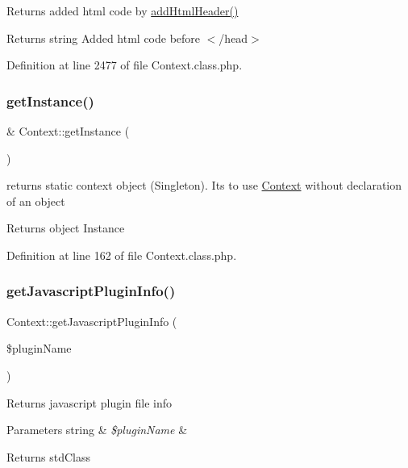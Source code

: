 Returns added html code by \hyperlink{classContext_a26a1aea944ae54bb826500f544a67950}{add\+Html\+Header()}

\begin{DoxyReturn}{Returns}
string Added html code before $<$/head$>$ 
\end{DoxyReturn}


Definition at line 2477 of file Context.\+class.\+php.

\hypertarget{classContext_a399e419617c7fe9b0c9eaf22c431df69}{}\label{classContext_a399e419617c7fe9b0c9eaf22c431df69} 
\subsubsection{\texorpdfstring{get\+Instance()}{getInstance()}}
{\footnotesize\ttfamily \& Context\+::get\+Instance (\begin{DoxyParamCaption}{ }\end{DoxyParamCaption})}

returns static context object (Singleton). It\textquotesingle{}s to use \hyperlink{classContext}{Context} without declaration of an object

\begin{DoxyReturn}{Returns}
object Instance 
\end{DoxyReturn}


Definition at line 162 of file Context.\+class.\+php.

\hypertarget{classContext_abf616bb3259e090c6e85b3aa1b581b60}{}\label{classContext_abf616bb3259e090c6e85b3aa1b581b60} 
\subsubsection{\texorpdfstring{get\+Javascript\+Plugin\+Info()}{getJavascriptPluginInfo()}}
{\footnotesize\ttfamily Context\+::get\+Javascript\+Plugin\+Info (\begin{DoxyParamCaption}\item[{}]{\$plugin\+Name }\end{DoxyParamCaption})}

Returns javascript plugin file info 
\begin{DoxyParams}[1]{Parameters}
string & {\em \$plugin\+Name} & \\
\hline
\end{DoxyParams}
\begin{DoxyReturn}{Returns}
std\+Class 
\end{DoxyReturn}


